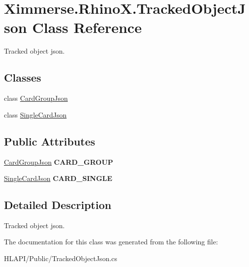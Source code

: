 \hypertarget{class_ximmerse_1_1_rhino_x_1_1_tracked_object_json}{}\section{Ximmerse.\+Rhino\+X.\+Tracked\+Object\+Json Class Reference}
\label{class_ximmerse_1_1_rhino_x_1_1_tracked_object_json}


Tracked object json.  


\subsection*{Classes}
\begin{DoxyCompactItemize}
\item 
class \mbox{\hyperlink{class_ximmerse_1_1_rhino_x_1_1_tracked_object_json_1_1_card_group_json}{Card\+Group\+Json}}
\item 
class \mbox{\hyperlink{class_ximmerse_1_1_rhino_x_1_1_tracked_object_json_1_1_single_card_json}{Single\+Card\+Json}}
\end{DoxyCompactItemize}
\subsection*{Public Attributes}
\begin{DoxyCompactItemize}
\item 
\mbox{\label{class_ximmerse_1_1_rhino_x_1_1_tracked_object_json_a2cff96b323cdee709f70857796362631}} 
\mbox{\hyperlink{class_ximmerse_1_1_rhino_x_1_1_tracked_object_json_1_1_card_group_json}{Card\+Group\+Json}} {\bfseries C\+A\+R\+D\+\_\+\+G\+R\+O\+UP}
\item 
\mbox{\label{class_ximmerse_1_1_rhino_x_1_1_tracked_object_json_aaaffeedb3f81e122cf331b59836d354a}} 
\mbox{\hyperlink{class_ximmerse_1_1_rhino_x_1_1_tracked_object_json_1_1_single_card_json}{Single\+Card\+Json}} {\bfseries C\+A\+R\+D\+\_\+\+S\+I\+N\+G\+LE}
\end{DoxyCompactItemize}


\subsection{Detailed Description}
Tracked object json. 



The documentation for this class was generated from the following file\+:\begin{DoxyCompactItemize}
\item 
H\+L\+A\+P\+I/\+Public/Tracked\+Object\+Json.\+cs\end{DoxyCompactItemize}

